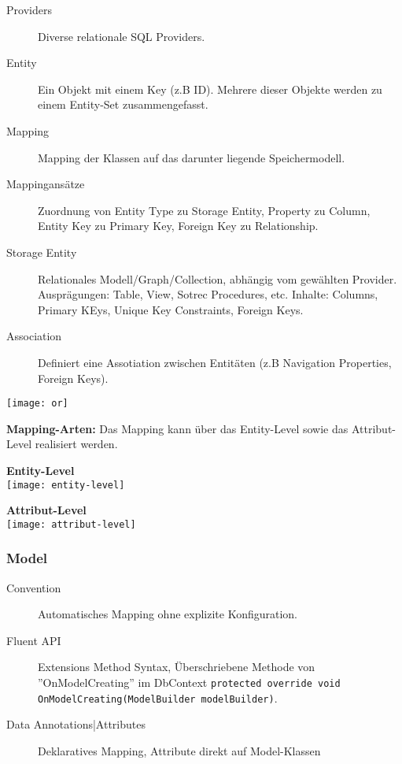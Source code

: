 \begin{minipage}{0,5\linewidth}
\begin{description}
    \item[Providers] Diverse relationale SQL Providers.
	\item[Entity] Ein Objekt mit einem Key (z.B ID). Mehrere dieser Objekte werden zu einem Entity-Set zusammengefasst.
	\item[Mapping] Mapping der Klassen auf das darunter liegende Speichermodell.
	\item[Mappingansätze] Zuordnung von Entity Type zu Storage Entity, Property zu Column, Entity Key zu Primary Key, Foreign Key zu Relationship.
	\item[Storage Entity] Relationales Modell/Graph/Collection, abhängig vom gewählten Provider. Ausprägungen: Table, View, Sotrec Procedures, etc. Inhalte: Columns, Primary KEys, Unique Key Constraints, Foreign Keys.
	\item[Association] Definiert eine Assotiation zwischen Entitäten (z.B Navigation Properties, Foreign Keys).
\end{description}

\end{minipage}
\begin{minipage}{0,5\linewidth}
	\center
  	\texttt{[image: or]}	
\end{minipage}

\textbf{Mapping-Arten:} Das Mapping kann über das Entity-Level sowie das Attribut-Level realisiert werden.

\begin{minipage}{0,5\linewidth}
	\textbf{Entity-Level}\\
	\texttt{[image: entity-level]}
\end{minipage}
\begin{minipage}{0,5\linewidth}
	\textbf{Attribut-Level}\\
	\texttt{[image: attribut-level]}
\end{minipage}

\subsubsection{Model}
\begin{description}
    \item[Convention] Automatisches Mapping ohne explizite Konfiguration.
    \item[Fluent API] Extensions Method Syntax, Überschriebene Methode von ''OnModelCreating'' im DbContext \lstinline|protected override void OnModelCreating(ModelBuilder modelBuilder)|.
    \item[Data Annotations|Attributes] Deklaratives Mapping, Attribute direkt auf Model-Klassen
\end{description}

